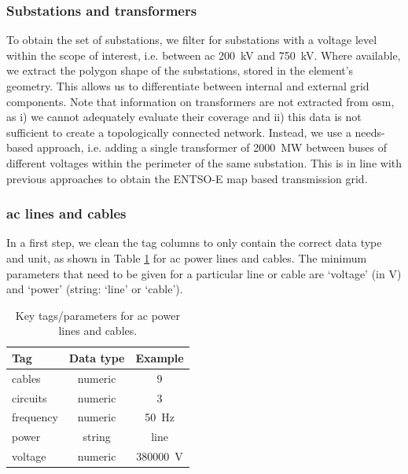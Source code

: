 \documentclass[fleqn,10pt]{wlscirep}
\let\autocite\cite
\begin{document}
\subsubsection*{Substations and transformers}
To obtain the set of substations, we filter for substations with a voltage level within the scope of interest, i.e. between \acrshort{ac} \SI{200}{\kilo\volt} and \SI{750}{\kilo\volt}. Where available, we extract the polygon shape of the substations, stored in the element's geometry. This allows us to differentiate between internal and external grid components. 
Note that information on transformers are not extracted from \acrshort{osm}, as i) we cannot adequately evaluate their coverage and ii) this data is not sufficient to create a topologically connected network. Instead, we use a needs-based approach, i.e. adding a single transformer of \SI{2000}{\mega\watt} between buses of different voltages within the perimeter of the same substation. This is in line with previous approaches to obtain the ENTSO-E map based transmission grid.\autocite{horschPyPSAEurOpenOptimisation2018}

\subsubsection*{\acrshort{ac} lines and cables} In a first step, we clean the tag columns to only contain the correct data type and unit, as shown in Table \ref{tab:aclines_params} for \acrshort{ac} power lines and cables. The minimum parameters that need to be given for a particular line or cable are `voltage' (in \si{\volt}) and `power' (string: `line' or `cable').
% 
\begin{table}[ht]
    \centering
    \begin{tabular}{|l|c|c|}
    \hline
    \textbf{Tag} & \textbf{Data type} & \textbf{Example} \\
    \hline
    cables & numeric & 9 \\
    \hline
    circuits & numeric & 3 \\
    \hline
    frequency & numeric & \SI{50}{\hertz} \\
    \hline
    power & string & line \\
    \hline
    voltage & numeric & \SI{380000}{\volt} \\
    \hline
    \end{tabular}
    \caption{Key tags/parameters for \acrshort{ac} power lines and cables.}
    \label{tab:aclines_params} 
\end{table}
\end{document}
